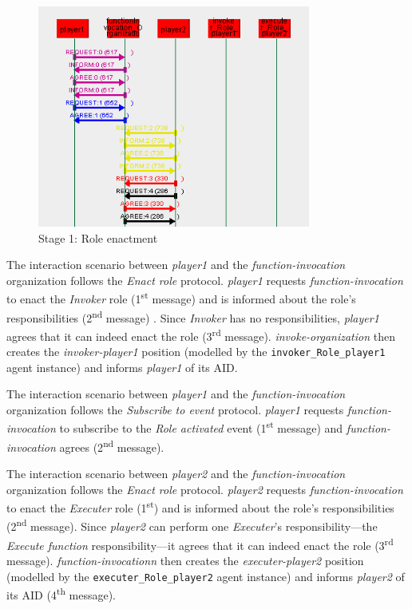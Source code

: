 \begin{figure}[H]
	\centering
	\includegraphics[width=0.8\textwidth]{images/examples/example1-stage1.png}
	\caption{Stage 1: Role enactment}
	\label{figure:example1-stage1}
\end{figure}

The {} interaction scenario between \textit{player1} and the \textit{function-invocation} organization follows the \textit{Enact role} protocol.
\textit{player1} requests \textit{function-invocation} to enact the \textit{Invoker} role (1\textsuperscript{st} message) and is informed about the role's responsibilities (2\textsuperscript{nd} message) .
Since \textit{Invoker} has no responsibilities, \textit{player1} agrees that it can indeed enact the role (3\textsuperscript{rd} message).
\textit{invoke-organization} then creates the \textit{invoker-player1} position (modelled by the \texttt{invoker\_Role\_player1} agent instance) and informs \textit{player1} of its AID.

The {} interaction scenario between \textit{player1} and the \textit{function-invocation} organization follows the \textit{Subscribe to event} protocol.
\textit{player1} requests \textit{function-invocation} to subscribe to the \textit{Role activated} event (1\textsuperscript{st} message) and \textit{function-invocation} agrees (2\textsuperscript{nd} message).

The {} interaction scenario between \textit{player2} and the \textit{function-invocation} organization follows the \textit{Enact role} protocol.
\textit{player2} requests \textit{function-invocation} to enact the \textit{Executer} role (1\textsuperscript{st}) and is informed about the role's responsibilities (2\textsuperscript{nd} message).
Since \textit{player2} can perform one \textit{Executer}'s responsibility---the \textit{Execute function} responsibility---it agrees that it can indeed enact the role (3\textsuperscript{rd} message).
\textit{function-invocationn} then creates the \textit{executer-player2} position (modelled by the \texttt{executer\_Role\_player2} agent instance) and informs \textit{player2} of its AID (4\textsuperscript{th} message).

